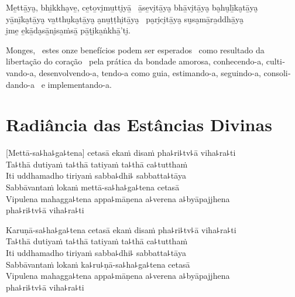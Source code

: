 
Me̱ttā̱ya̮, bhi̱kkha̮ve̱, ce̱to̱vi̮mu̱tti̮yā̱ \pause\ ā̱se̱vi̮tā̱ya̮ bhā̱vi̮tā̱ya̮ ba̮hu̮lī̱ka̮tā̱ya̮ \pause\\
yā̱nī̱ka̮tā̱ya̮ va̱tthu̮ka̮tā̱ya̮ a̮nu̱ṭṭhi̮tā̱ya̮ \pause\ pa̮ri̮ci̮tā̱ya̮ su̮sa̮mā̱ra̱ddhā̱ya̮ \pause\\
i̮me̱ e̱kā̱da̮sā̱ni̮sa̱ṁsā̱ pā̱ṭi̮ka̱ṅkhā̱'ti̮.

\begin{english}
  Monges, \pause\ estes onze benefícios podem ser esperados \pause\ como resultado da libertação do coração \pause\ pela prática da bondade amorosa, conhecendo-a, cultivando-a, desenvolvendo-a, tendo-a como guia, estimando-a, seguindo-a, consolidando-a \pause\ e implementando-a.
\end{english}

\chapter*[Radiância das Estâncias Divinas]{Radiância das Estâncias Divinas}

\delegateSetUseNext


\begin{leader}
\end{leader}

[Mettā-sa꜕ha꜕ga꜕tena] cetasā ekaṁ disaṁ pha꜕ri꜕tv꜕ā viha꜕ra꜕ti\\
Ta꜕thā dutiyaṁ ta꜕thā tatiyaṁ ta꜕thā ca꜕tutthaṁ\\
Iti uddhamadho tiriyaṁ sabba꜕dhi꜕ sabbatta꜕tāya\\
Sabbāvantaṁ lokaṁ mettā-sa꜕ha꜕ga꜕tena cetasā\\
Vipulena mahagga꜕tena appa꜕māṇena a꜕verena a꜕byāpajjhena\\
\vin pha꜕ri꜕tv꜕ā viha꜕ra꜕ti

Karuṇā-sa꜕ha꜕ga꜕tena cetasā ekaṁ disaṁ pha꜕ri꜕tv꜕ā viha꜕ra꜕ti\\
Ta꜕thā dutiyaṁ ta꜕thā tatiyaṁ ta꜕thā ca꜕tutthaṁ\\
Iti uddhamadho tiriyaṁ sabba꜕dhi꜕ sabbatta꜕tāya\\
Sabbāvantaṁ lokaṁ ka꜕ru꜕ṇā-sa꜕ha꜕ga꜕tena cetasā\\
Vipulena mahagga꜕tena appa꜕māṇena a꜕verena a꜕byāpajjhena\\
\vin pha꜕ri꜕tv꜕ā viha꜕ra꜕ti

